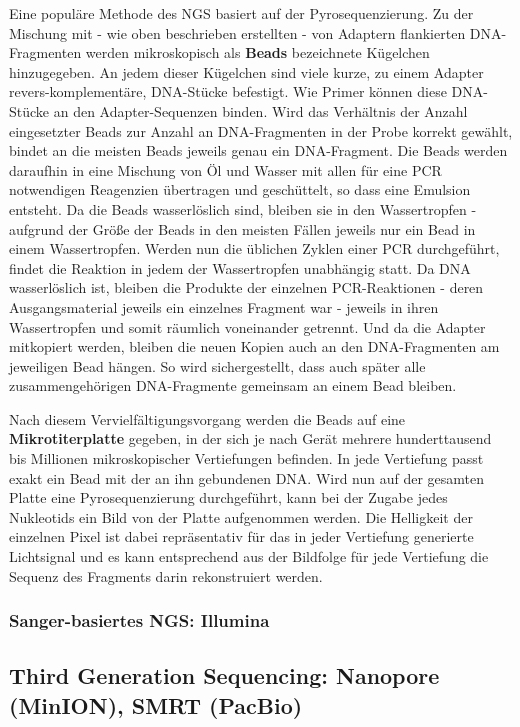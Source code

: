 Eine populäre Methode des NGS basiert auf der Pyrosequenzierung. Zu der Mischung mit - wie oben beschrieben erstellten - von Adaptern flankierten DNA-Fragmenten werden mikroskopisch als \textbf{Beads} bezeichnete Kügelchen hinzugegeben. An jedem dieser Kügelchen sind viele kurze, zu einem Adapter revers-komplementäre, DNA-Stücke befestigt. Wie Primer können diese DNA-Stücke an den Adapter-Sequenzen binden. Wird das Verhältnis der Anzahl eingesetzter Beads zur Anzahl an DNA-Fragmenten in der Probe korrekt gewählt, bindet an die meisten Beads jeweils genau ein DNA-Fragment. Die Beads werden daraufhin in eine Mischung von Öl und Wasser mit allen für eine PCR notwendigen Reagenzien übertragen und geschüttelt, so dass eine Emulsion entsteht. Da die Beads wasserlöslich sind, bleiben sie in den Wassertropfen - aufgrund der Größe der Beads in den meisten Fällen jeweils nur ein Bead in einem Wassertropfen. Werden nun die üblichen Zyklen einer PCR durchgeführt, findet die Reaktion in jedem der Wassertropfen unabhängig statt. Da DNA wasserlöslich ist, bleiben die Produkte der einzelnen PCR-Reaktionen - deren Ausgangsmaterial jeweils ein einzelnes Fragment war - jeweils in ihren Wassertropfen und somit räumlich voneinander getrennt. Und da die Adapter mitkopiert werden, bleiben die neuen Kopien auch an den DNA-Fragmenten am jeweiligen Bead hängen. So wird sichergestellt, dass auch später alle zusammengehörigen DNA-Fragmente gemeinsam an einem Bead bleiben. 

Nach diesem Vervielfältigungsvorgang werden die Beads auf eine \textbf{Mikrotiterplatte} gegeben, in der sich je nach Gerät mehrere hunderttausend bis Millionen mikroskopischer Vertiefungen befinden. In jede Vertiefung passt exakt ein Bead mit der an ihn gebundenen DNA. Wird nun auf der gesamten Platte eine Pyrosequenzierung durchgeführt, kann bei der Zugabe jedes Nukleotids ein Bild von der Platte aufgenommen werden. Die Helligkeit der einzelnen Pixel ist dabei repräsentativ für das in jeder Vertiefung generierte Lichtsignal und es kann entsprechend aus der Bildfolge für jede Vertiefung die Sequenz des Fragments darin rekonstruiert werden.  

\subsubsection{Sanger-basiertes NGS: Illumina}

\subsection{Third Generation Sequencing: Nanopore (MinION), SMRT (PacBio)}

